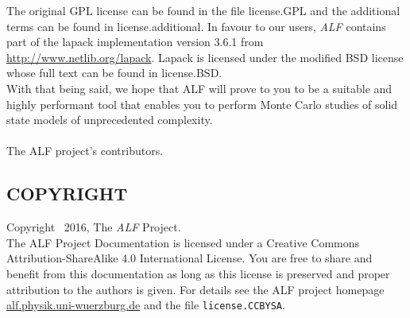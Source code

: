 The original GPL license can be found in the file license.GPL and the additional terms can be found in license.additional.
In favour to our users, \textit{ALF} contains part of the lapack implementation version 3.6.1 from \url{http://www.netlib.org/lapack}.
Lapack is licensed under the modified BSD license whose full text can be found in license.BSD.\\
With that being said, we hope that ALF will prove to you to be a suitable and highly performant tool that enables
you to perform Monte Carlo studies of solid state models of unprecedented complexity.\\
\\
The ALF project's contributors.\\
                        
\subsection*{COPYRIGHT}

Copyright \textcopyright ~2016, The \textit{ALF} Project.\\
The ALF Project Documentation 
is licensed under a Creative Commons Attribution-ShareAlike 4.0 International License.
You are free to share and benefit from this documentation as long as this license is preserved
and proper attribution to the authors is given. For details see the ALF project
homepage \url{alf.physik.uni-wuerzburg.de} and the file \texttt{license.CCBYSA}.

